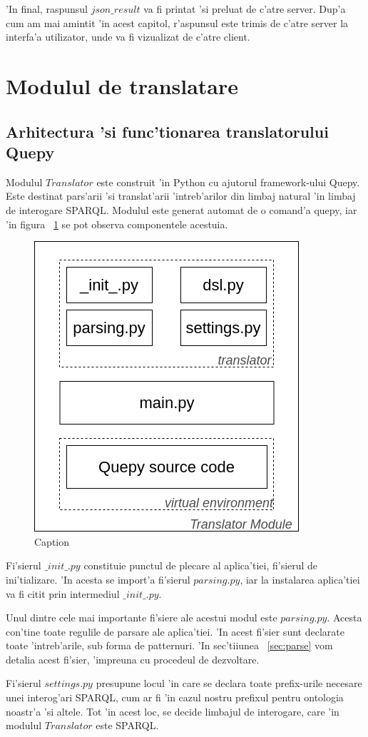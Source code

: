\documentclass[12pt,a4paper,twoside]{report}
\begin{document}
'In final, raspunsul $json\_result$ va fi printat 'si preluat de c'atre server. Dup'a cum am mai amintit 'in acest capitol, r'aspunsul este trimis de c'atre server la interfa'a utilizator, unde va fi vizualizat de c'atre client.


\section{Modulul de translatare}
\subsection{Arhitectura 'si func'tionarea translatorului Quepy}


Modulul $Translator$ este construit 'in Python cu ajutorul framework-ului Quepy. Este destinat pars'arii 'si translat'arii 'intreb'arilor din limbaj natural 'in limbaj de interogare SPARQL. Modulul este generat automat de o comand'a quepy, iar 'in figura ~\ref{fig:quepy_files} se pot observa componentele acestuia. 
\begin{figure}
    \centering
    \includegraphics[width = 0.45\linewidth]{img/quepy_schema.png}
    \caption{Caption}
    \label{fig:quepy_files}
\end{figure}

Fi'sierul $\_init\_.py$ constituie punctul de plecare al aplica'tiei, fi'sierul de ini'tializare. 'In acesta se import'a fi'sierul $parsing.py$, iar la instalarea aplica'tiei va fi citit prin intermediul $\_init\_.py$. 

Unul dintre cele mai importante fi'siere ale acestui modul este $parsing.py$. Acesta con'tine toate regulile de parsare ale aplica'tiei. 'In acest fi'sier sunt declarate toate 'intreb'arile, sub forma de patternuri. 'In sec'tiiunea ~\ref{sec:parse} vom detalia acest fi'sier, 'impreuna cu procedeul de dezvoltare.

Fi'sierul $settings.py$ presupune locul 'in care se declara toate prefix-urile necesare unei interog'ari SPARQL, cum ar fi 'in cazul nostru prefixul pentru ontologia noastr'a 'si altele. Tot 'in acest loc, se decide limbajul de interogare, care 'in modulul $Translator$ este SPARQL.
\end{document}
